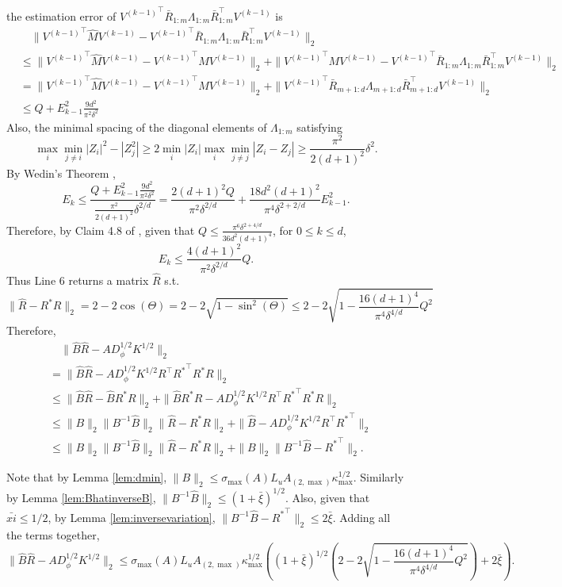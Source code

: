 the estimation error of ${V^{(k-1)}}^\top\bar{R}_{1:m}\Lambda_{1:m} \bar{R}_{1:m}^{\top} V^{(k-1)}$ is 
\begin{align*}
& \quad \| {V^{(k-1)}}^\top \hat{M}V^{(k-1)} - {V^{(k-1)}}^\top\bar{R}_{1:m}\Lambda_{1:m} \bar{R}_{1:m}^{\top} V^{(k-1)} \|_2 \\
& \le \|{V^{(k-1)}}^\top \hat{M}V^{(k-1)} - {V^{(k-1)}}^\top MV^{(k-1)}\|_2 + \| {V^{(k-1)}}^\top MV^{(k-1)} -{V^{(k-1)}}^\top\bar{R}_{1:m}\Lambda_{1:m} \bar{R}_{1:m}^{\top} V^{(k-1)} \|_2 \\
&  = \|{V^{(k-1)}}^\top \hat{M}V^{(k-1)} - {V^{(k-1)}}^\top MV^{(k-1)}\|_2 + \|{V^{(k-1)}}^\top\bar{R}_{m+1:d}\Lambda_{m+1:d}\bar{R}_{m+1:d}^{\top} V^{(k-1)} \|_2 \\
& \le Q + E_{k-1}^2 \frac{9d^2}{\pi^2\delta^2} 
\end{align*}
Also, the minimal spacing of the diagonal elements of $\Lambda_{1:m}$ satisfying
\[
\max_i\min_{j\neq i} |Z_i|^2 - |Z_j^2| \ge 2\min_i |Z_i| \max_i\min_{j\neq j} |Z_i - Z_j| \ge \frac{\pi^2}{2(d+1)^2}\delta^2.
\] 
By Wedin's Theorem \citep{stewart1990matrix}, 
\[
E_k \le \frac{Q + E_{k-1}^2 \frac{9d^2}{\pi^2\delta^2} }{\frac{\pi^2}{2(d+1)^2}\delta^{2/d}} = \frac{2(d+1)^2Q}{\pi^2\delta^{2/d}} + \frac{18d^2(d+1)^2}{\pi^4\delta^{2+2/d}}E_{k-1}^2.
\]
Therefore, by Claim 4.8 of \citet{vempala2014max}, given that $Q\le \frac{\pi^6\delta^{2+4/d}}{36d^2(d+1)^4}$, for $0\le k\le d$,
\[
E_k \le \frac{4(d+1)^2}{\pi^2\delta^{2/d}}Q. 
\]
Thus Line 6 returns a matrix $\hat{R}$ s.t.
\[
\|\hat{R} - R^*R\|_2 = 2-2\cos(\Theta)= 2 - 2\sqrt{1-\sin^2(\Theta)} \le 2 - 2\sqrt{1-\frac{16(d+1)^4}{\pi^4\delta^{4/d}}Q^2}
\]
Therefore,
\begin{align*}
& \quad \| \hat{B}\hat{R} - AD_{\phi}^{1/2}K^{1/2}\|_2 \\
& = \| \hat{B}\hat{R} - AD_{\phi}^{1/2}K^{1/2}R^{\top}{R^*}^{\top}R^*R\|_2 \\
& \le \| \hat{B}\hat{R} -  \hat{B}R^*R\|_2 + \|\hat{B}R^*R - AD_{\phi}^{1/2}K^{1/2}R^{\top}{R^*}^{\top}R^*R \|_2 \\
& \le \|B\|_2\|B^{-1}\hat{B}\|_2\|\hat{R} - R^*R\|_2 + \|\hat{B} - AD_{\phi}^{1/2}K^{1/2}R^{\top}{R^*}^{\top}\|_2 \\
& \le  \|B\|_2\|B^{-1}\hat{B}\|_2\|\hat{R} - R^*R\|_2 +\|B\|_2\|B^{-1}\hat{B} - {R^*}^{\top}\|_2.
\end{align*}

Note that by Lemma \ref{lem:dmin}, 
 $ \|B\|_2 \le \sigma_{\max}(A)L_uA_{(2,\max)}\kappa_{\max}^{1/2}$. 
Similarly by Lemma \ref{lem:BhatinverseB}, $\| B^{-1}\hat{B}\|_2 \le (1+\bar{\xi})^{1/2}$. 
Also, given that $\bar{xi} \le 1/2$, by Lemma \ref{lem:inversevariation}, $\|B^{-1}\hat{B} -{R^*}^{\top}\|_2 \le 2\bar{\xi}$.
Adding all the terms together,
\[
\| \hat{B}\hat{R} - AD_{\phi}^{1/2}K^{1/2}\|_2 \le \sigma_{\max}(A)L_uA_{(2,\max)}\kappa_{\max}^{1/2}\left((1+\bar{\xi})^{1/2}\left(  2 - 2\sqrt{1-\frac{16(d+1)^4}{\pi^4\delta^{4/d}}Q^2}\right) + 2\bar{\xi}\right).
\] 

